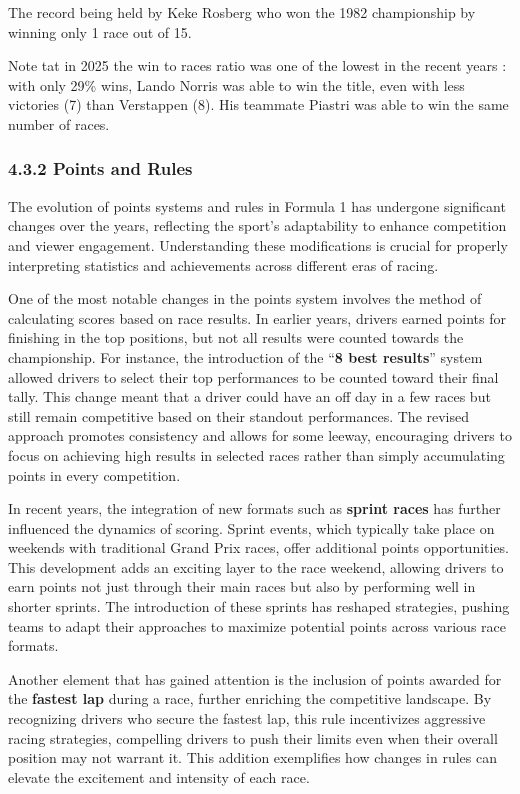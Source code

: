 \documentclass[
]{article}
\begin{document}
The record being held by Keke Rosberg who won the 1982 championship by
winning only 1 race out of 15.

Note tat in 2025 the win to races ratio was one of the lowest in the
recent years : with only 29\% wins, Lando Norris was able to win the
title, even with less victories (7) than Verstappen (8). His teammate
Piastri was able to win the same number of races.

\newpage

\subsubsection{4.3.2 Points and Rules}\label{points-and-rules}

The evolution of points systems and rules in Formula 1 has undergone
significant changes over the years, reflecting the sport's adaptability
to enhance competition and viewer engagement. Understanding these
modifications is crucial for properly interpreting statistics and
achievements across different eras of racing.

One of the most notable changes in the points system involves the method
of calculating scores based on race results. In earlier years, drivers
earned points for finishing in the top positions, but not all results
were counted towards the championship. For instance, the introduction of
the ``\textbf{8 best results}'' system allowed drivers to select their
top performances to be counted toward their final tally. This change
meant that a driver could have an off day in a few races but still
remain competitive based on their standout performances. The revised
approach promotes consistency and allows for some leeway, encouraging
drivers to focus on achieving high results in selected races rather than
simply accumulating points in every competition.

In recent years, the integration of new formats such as \textbf{sprint
races} has further influenced the dynamics of scoring. Sprint events,
which typically take place on weekends with traditional Grand Prix
races, offer additional points opportunities. This development adds an
exciting layer to the race weekend, allowing drivers to earn points not
just through their main races but also by performing well in shorter
sprints. The introduction of these sprints has reshaped strategies,
pushing teams to adapt their approaches to maximize potential points
across various race formats.

Another element that has gained attention is the inclusion of points
awarded for the \textbf{fastest lap} during a race, further enriching
the competitive landscape. By recognizing drivers who secure the fastest
lap, this rule incentivizes aggressive racing strategies, compelling
drivers to push their limits even when their overall position may not
warrant it. This addition exemplifies how changes in rules can elevate
the excitement and intensity of each race.
\end{document}
